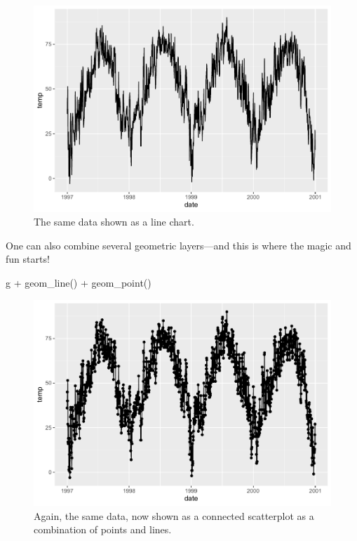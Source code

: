 \documentclass[
]{krantz}
\makeatletter
\newenvironment{Shaded}{\begin{snugshade}}{\end{snugshade}}
\newcommand{\FunctionTok}[1]{\textcolor[rgb]{0,0,0}{#1}}
\newcommand{\NormalTok}[1]{#1}
\newcommand{\SpecialCharTok}[1]{\textcolor[rgb]{0,0,0}{#1}}
\newenvironment{kframe}{%
\medskip{}
\setlength{\fboxsep}{.8em}
 \def\at@end@of@kframe{}%
 \ifinner\ifhmode%
  \def\at@end@of@kframe{\end{minipage}}%
  \begin{minipage}{\columnwidth}%
 \fi\fi%
 \def\FrameCommand##1{\hskip\@totalleftmargin \hskip-\fboxsep
 \colorbox{shadecolor}{##1}\hskip-\fboxsep
     \hskip-\linewidth \hskip-\@totalleftmargin \hskip\columnwidth}%
 \MakeFramed {\advance\hsize-\width
   \@totalleftmargin\z@ \linewidth\hsize
   \@setminipage}}%
 {\par\unskip\endMakeFramed%
 \at@end@of@kframe}
\renewenvironment{Shaded}{\begin{kframe}}{\end{kframe}}
\makeatother
\begin{document}
\begin{figure}
\centering
\includegraphics{bookdown_files/figure-latex/ggplot-default-line-1.pdf}
\caption{\label{fig:ggplot-default-line}The same data shown as a line chart.}
\end{figure}

One can also combine several geometric layers---and this is where the magic and fun starts!

\begin{Shaded}
\begin{Highlighting}[]
\NormalTok{g }\SpecialCharTok{+} \FunctionTok{geom\_line}\NormalTok{() }\SpecialCharTok{+} \FunctionTok{geom\_point}\NormalTok{()}
\end{Highlighting}
\end{Shaded}

\begin{figure}
\centering
\includegraphics{bookdown_files/figure-latex/ggplot-default-line-point-1.pdf}
\caption{\label{fig:ggplot-default-line-point}Again, the same data, now shown as a connected scatterplot as a combination of points and lines.}
\end{figure}
\end{document}
